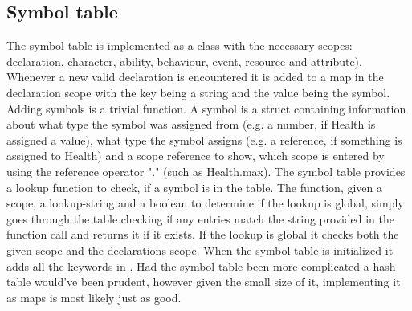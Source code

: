 \subsection{Symbol table}
The symbol table is implemented as a class with the necessary scopes: declaration, character, ability, behaviour, event, resource and attribute). Whenever a new valid declaration is encountered it is added to a map in the declaration scope with the key being a string and the value being the symbol. Adding symbols is a trivial function. 
\vspace{10pt}
A symbol is a struct containing information about what type the symbol was assigned from (e.g. a number, if Health is assigned a value), what type the symbol assigns (e.g. a reference, if something is assigned to Health) and a scope reference to show, which scope is entered by using the reference operator "." (such as Health.max). 
\vspace{10pt}
The symbol table provides a lookup function to check, if a symbol is in the table. The function, given a scope, a lookup-string and a boolean to determine if the lookup is global, simply goes through the table checking if any entries match the string provided in the function call and returns it if it exists. If the lookup is global it checks both the given scope and the declarations scope. When the symbol table is initialized it adds all the keywords in \langname{}.
\vspace{10pt}
Had the symbol table been more complicated a hash table would've been prudent, however given the small size of it, implementing it as maps is most likely just as good.